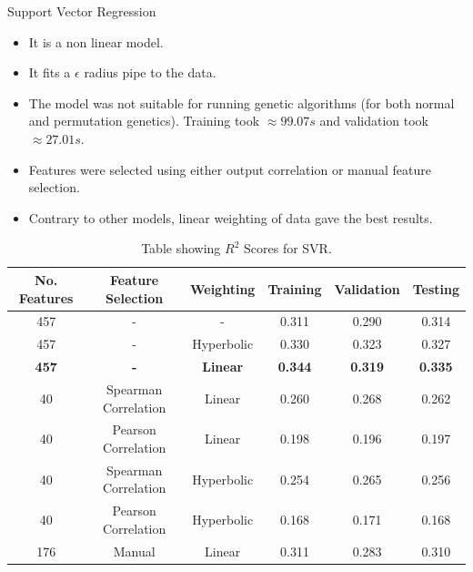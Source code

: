 \documentclass{beamer}
\begin{document}
\begin{frame}[t]{Support Vector Regression}
\begin{itemize}
\item It is a non linear model.
\item It fits a $\epsilon$ radius pipe to the data.
\item The model was not suitable for running genetic algorithms (for both normal and permutation genetics).  Training took $\approx 99.07 s$ and validation took $\approx 27.01 s$.
\item Features were selected using either output correlation or manual feature selection.
\item Contrary to other models,  linear weighting of data gave the best results.
\end{itemize}

\begin{table} [h!]
\centering
\resizebox{0.7\linewidth}{!} {
 \begin{tabular}{ | c | c | c | c | c | c | }
\hline
\textbf{No. Features} & \textbf{Feature Selection} & \textbf{Weighting} & \textbf{Training} & \textbf{Validation} &  \textbf{Testing} \\ [0.5 ex]
\hline \hline
457 & - & - & 0.311 & 0.290 & 0.314\\
457 & - & Hyperbolic & 0.330 & 0.323 & 0.327\\
\textbf{457} & \textbf{-} & \textbf{Linear}  & \textbf{0.344} &\textbf{0.319} & \textbf{0.335}\\
40 & Spearman Correlation & Linear & 0.260 & 0.268  & 0.262 \\ 
40 & Pearson Correlation & Linear & 0.198 & 0.196 & 0.197 \\ 
40 & Spearman Correlation & Hyperbolic & 0.254 & 0.265 & 0.256 \\ 
40 & Pearson Correlation & Hyperbolic & 0.168 & 0.171 & 0.168 \\ 
176 & Manual & Linear &  0.311  & 0.283  & 0.310\\ [1ex]
\hline
\end{tabular}
}
\caption{Table showing  $R^2$ Scores for SVR.}
\label {table:2}
\end{table}

\end{frame}
\end{document}
